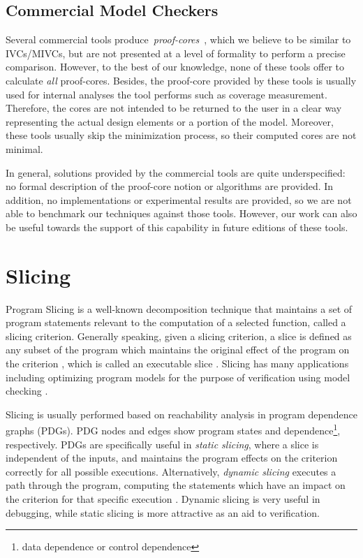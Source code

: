 \subsection{Commercial Model Checkers}
Several commercial tools produce~\emph{proof-cores}~\cite{hanna2015formal, jasper_gold}, which we believe to be similar to IVCs/MIVCs, but are not presented at a level of formality to perform a precise comparison.  However, to the best of our knowledge, none of these tools offer to calculate \emph{all} proof-cores. Besides, the proof-core provided by these tools is usually used for internal analyses the tool performs such as coverage measurement. Therefore, the cores are not intended to be returned to the user in a clear way representing the actual design elements or a portion of the model. Moreover, these tools usually skip the minimization process, so their computed cores are not minimal.

In general, solutions provided by the commercial tools are quite underspecified:
no formal description of the proof-core notion or algorithms are provided. In addition, no implementations or experimental results are provided, so we are not able to benchmark our techniques against those tools. However, our work can also be useful towards the support of this capability in future editions of these tools.

\section{Slicing}

Program  Slicing  is  a  well-known  decomposition  technique  that  maintains a
set of program statements  relevant to  the computation  of a  selected  function, called a slicing criterion. Generally speaking, given a slicing criterion, a slice is defined
 as any subset of the program which maintains the original effect of the program on the criterion \cite{Weiser97}, which is called an executable slice \cite{Androutsopoulos}.
  Slicing has many applications including optimizing program models
   for the purpose of verification using model checking \cite{Androutsopoulos, Jhala:2005, Dwyer:2006}.

Slicing is usually performed based on reachability analysis in program
dependence graphs (PDGs). PDG nodes and edges show program states and dependence\footnote{data dependence or control dependence}, respectively. PDGs are specifically useful in \emph{static slicing}, where
a slice is independent of the inputs,
 and maintains the program effects on the criterion
correctly for all possible executions. Alternatively,
\emph{dynamic slicing} executes a path through the program, computing the statements which have an impact on the criterion for that
specific execution \cite{Androutsopoulos}. Dynamic slicing is very useful in debugging, while static slicing is more attractive as an aid to verification.

